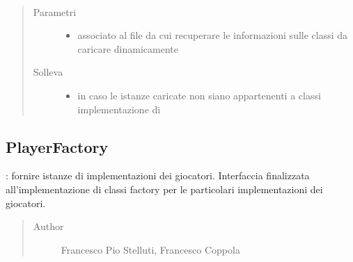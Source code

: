 \documentclass[letterpaper,10pt,italian,openany,oneside]{sphinxmanual}
\begin{document}
\begin{fulllineitems}
\label{\detokenize{test/it/unicam/cs/pa/mastermind/factories/MakerFactoryRegistry:it.unicam.cs.pa.mastermind.factories.MakerFactoryRegistry.MakerFactoryRegistry(String)}}~\begin{quote}\begin{description}
\item[{Parametri}] \leavevmode\begin{itemize}
\item {} 
 \textendash{} associato al file da cui recuperare le informazioni sulle classi da caricare dinamicamente

\end{itemize}

\item[{Solleva}] \leavevmode\begin{itemize}
\item {} 
 \textendash{} in caso le istanze caricate non siano appartenenti a classi implementazione di 

\end{itemize}

\end{description}\end{quote}

\end{fulllineitems}



\subsection{PlayerFactory}
\label{\detokenize{test/it/unicam/cs/pa/mastermind/factories/PlayerFactory:playerfactory}}\label{\detokenize{test/it/unicam/cs/pa/mastermind/factories/PlayerFactory::doc}}

\begin{fulllineitems}
\label{\detokenize{test/it/unicam/cs/pa/mastermind/factories/PlayerFactory:it.unicam.cs.pa.mastermind.factories.PlayerFactory}}
: fornire istanze di implementazioni dei giocatori. Interfaccia finalizzata all’implementazione di classi factory per le particolari implementazioni dei giocatori.
\begin{quote}\begin{description}
\item[{Author}] \leavevmode
Francesco Pio Stelluti, Francesco Coppola

\end{description}\end{quote}

\end{fulllineitems}
\end{document}
